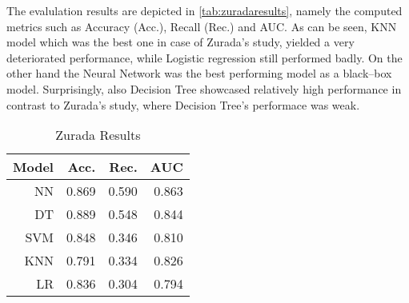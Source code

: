 The evalulation results are depicted in \autoref{tab:zuradaresults}, namely the computed metrics such as Accuracy (Acc.), Recall (Rec.) and AUC.
As can be seen, KNN model which was the best one in case of Zurada's study, yielded a very deteriorated performance, while Logistic regression still performed badly.
On the other hand the Neural Network was the best performing model as a black--box model. Surprisingly, also Decision Tree showcased relatively high performance  in contrast to Zurada's study, where Decision Tree's performace was weak.
\begin{table}[H]
    \small
    \setlength{\tabcolsep}{8pt}
    \renewcommand{\arraystretch}{1.3}
    \centering
    \caption[Zurada Results]{Zurada Results}\label{tab:zuradaresults}
    \begin{tabular}{r r r r}
    \toprule
    Model & Acc. & Rec. & AUC\\
    \midrule
    \hline
    NN & 0.869 & 0.590 & 0.863 \\
    DT & 0.889 & 0.548 & 0.844 \\
    SVM & 0.848 & 0.346 & 0.810 \\
    KNN & 0.791 & 0.334 & 0.826 \\
    LR & 0.836 & 0.304 & 0.794 \\
    \hline
    \bottomrule
    \end{tabular}
    \vspace{0.35em}
    
    \vspace{-1em}
\end{table}

